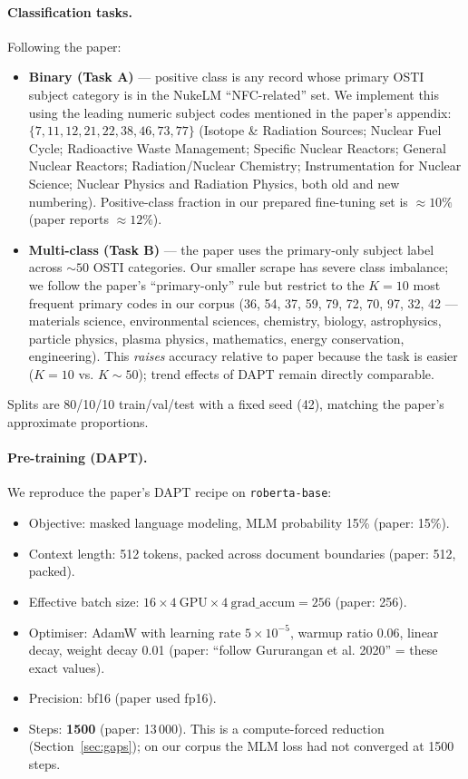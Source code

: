 \documentclass[11pt]{article}
\begin{document}
\paragraph{Classification tasks.} Following the paper:
\begin{itemize}
  \item \textbf{Binary (Task A)} --- positive class is any record whose primary OSTI subject category is in the NukeLM ``NFC-related'' set. We implement this using the leading numeric subject codes mentioned in the paper's appendix: $\{7, 11, 12, 21, 22, 38, 46, 73, 77\}$ (Isotope \& Radiation Sources; Nuclear Fuel Cycle; Radioactive Waste Management; Specific Nuclear Reactors; General Nuclear Reactors; Radiation/Nuclear Chemistry; Instrumentation for Nuclear Science; Nuclear Physics and Radiation Physics, both old and new numbering). Positive-class fraction in our prepared fine-tuning set is $\approx 10\%$ (paper reports $\approx 12\%$).
  \item \textbf{Multi-class (Task B)} --- the paper uses the primary-only subject label across $\sim 50$ OSTI categories. Our smaller scrape has severe class imbalance; we follow the paper's ``primary-only'' rule but restrict to the $K=10$ most frequent primary codes in our corpus (36, 54, 37, 59, 79, 72, 70, 97, 32, 42 --- materials science, environmental sciences, chemistry, biology, astrophysics, particle physics, plasma physics, mathematics, energy conservation, engineering). This \emph{raises} accuracy relative to paper because the task is easier ($K=10$ vs. $K\sim 50$); trend effects of DAPT remain directly comparable.
\end{itemize}
Splits are 80/10/10 train/val/test with a fixed seed (42), matching the paper's approximate proportions.

\paragraph{Pre-training (DAPT).} We reproduce the paper's DAPT recipe on \texttt{roberta-base}:
\begin{itemize}
  \item Objective: masked language modeling, MLM probability 15\% (paper: 15\%).
  \item Context length: 512 tokens, packed across document boundaries (paper: 512, packed).
  \item Effective batch size: $16 \times 4~\text{GPU} \times 4~\text{grad\_accum} = 256$ (paper: 256).
  \item Optimiser: AdamW with learning rate $5 \times 10^{-5}$, warmup ratio 0.06, linear decay, weight decay 0.01 (paper: ``follow Gururangan et al. 2020'' = these exact values).
  \item Precision: bf16 (paper used fp16).
  \item Steps: \textbf{1500} (paper: 13\,000). This is a compute-forced reduction (Section~\ref{sec:gaps}); on our corpus the MLM loss had not converged at 1500 steps.
\end{itemize}
\end{document}
